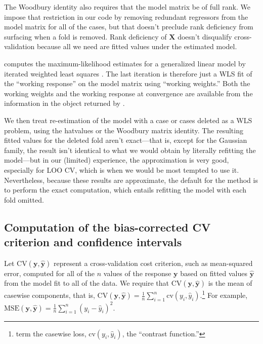 \documentclass[
]{jss}
\begin{document}
The Woodbury identity also requires that the model matrix be of full
rank. We impose that restriction in our code by removing redundant
regressors from the model matrix for all of the cases, but that doesn't
preclude rank deficiency from surfacing when a fold is removed. Rank
deficiency of \(\mathbf{X}\) doesn't disqualify cross-validation because
all we need are fitted values under the estimated model.

 computes the maximum-likelihood estimates for a generalized
linear model by iterated weighted least squares \citep[see, e.g.,][Sec.
6.12]{FoxWeisberg:2019}. The last iteration is therefore just a WLS fit
of the ``working response'' on the model matrix using ``working
weights.'' Both the working weights and the working response at
convergence are available from the information in the object returned by
.

We then treat re-estimation of the model with a case or cases deleted as
a WLS problem, using the hatvalues or the Woodbury matrix identity. The
resulting fitted values for the deleted fold aren't exact---that is,
except for the Gaussian family, the result isn't identical to what we
would obtain by literally refitting the model---but in our (limited)
experience, the approximation is very good, especially for LOO CV, which
is when we would be most tempted to use it. Nevertheless, because these
results are approximate, the default for the  
method is to perform the exact computation, which entails refitting the
model with each fold omitted.

\hypertarget{computation-of-the-bias-corrected-cv-criterion-and-confidence-intervals}{%
\subsection{Computation of the bias-corrected CV criterion and
confidence
intervals}\label{computation-of-the-bias-corrected-cv-criterion-and-confidence-intervals}}

Let \(\mathrm{CV}(\mathbf{y}, \widehat{\mathbf{y}})\) represent a
cross-validation cost criterion, such as mean-squared error, computed
for all of the \(n\) values of the response \(\mathbf{y}\) based on
fitted values \(\widehat{\mathbf{y}}\) from the model fit to all of the
data. We require that \(\mathrm{CV}(\mathbf{y}, \widehat{\mathbf{y}})\)
is the mean of casewise components, that is,
\(\mathrm{CV}(\mathbf{y}, \widehat{\mathbf{y}}) = \frac{1}{n}\sum_{i=1}^n\mathrm{cv}(y_i, \widehat{y}_i)\).\footnote{\citet{ArlotCelisse:2010}
  term the casewise loss, \(\mathrm{cv}(y_i, \widehat{y}_i)\), the
  ``contrast function.''} For example,
\(\mathrm{MSE}(\mathbf{y}, \widehat{\mathbf{y}}) = \frac{1}{n}\sum_{i=1}^n (y_i - \widehat{y}_i)^2\).
\end{document}
